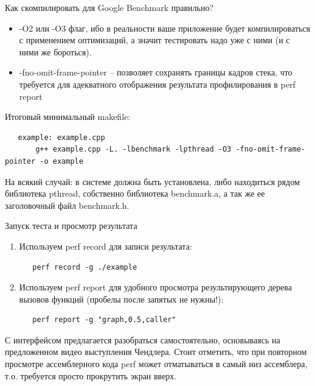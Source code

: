 \begin{frame}[fragile]{Как скомпилировать для Google Benchmark правильно?}
	\begin{itemize}
		\item -O2 или -O3 флаг, ибо в реальности ваше приложение будет компилироваться с применением оптимизаций, а значит тестировать надо уже с ними (и с ними же бороться).
		\item -fno-omit-frame-pointer -- позволяет сохранять границы кадров стека, что требуется для адекватного отображения результата профилирования в perf report
	\end{itemize}
	Итоговый минимальный makefile:
	\tiny
\begin{lstlisting}
   example: example.cpp
       g++ example.cpp -L. -lbenchmark -lpthread -O3 -fno-omit-frame-pointer -o example
\end{lstlisting}

	\normalsize
	На всякий случай: в системе должна быть установлена, либо находиться рядом библиотека pthread, собственно библиотека benchmark.a, а так же ее заголовочный файл benchmark.h.
\end{frame}

\begin{frame}[fragile]{Запуск теста и просмотр результата}
	\begin{enumerate}
		\item Используем perf record для записи результата:
\begin{lstlisting}
   perf record -g ./example
\end{lstlisting}
		\item Используем perf report для удобного просмотра результирующего дерева вызовов функций (пробелы после запятых не нужны!):
\begin{lstlisting}
   perf report -g "graph,0.5,caller"
\end{lstlisting}
	\end{enumerate}
	С интерфейсом предлагается разобраться самостоятельно, основываясь на предложенном видео выступления Чендлера. Стоит отметить, что при повторном просмотре ассемблерного кода perf может отматываться в самый низ ассемблера, т.о. требуется просто прокрутить экран вверх.
\end{frame}

